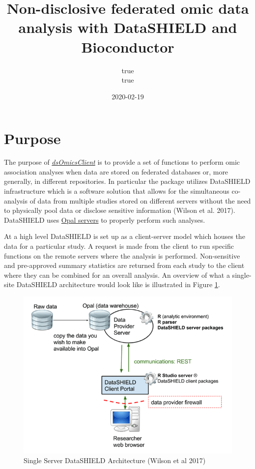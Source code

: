 \documentclass[]{article}
\title{Non-disclosive federated omic data analysis with DataSHIELD and
Bioconductor}
\author{true \\ true}
\date{2020-02-19}
\begin{document}
\maketitle

\hypertarget{purpose}{%
\section{Purpose}\label{purpose}}

The purpose of
\emph{\href{https://github.com/isgloba-brge}{dsOmicsClient}} is to
provide a set of functions to perform omic association analyses when
data are stored on federated databases or, more generally, in different
repositories. In particular the package utilizes DataSHIELD
infrastructure which is a software solution that allows for the
simultaneous co-analysis of data from multiple studies stored on
different servers without the need to physically pool data or disclose
sensitive information (Wilson et al. 2017). DataSHIELD uses
\href{http://opaldoc.obiba.org/en/latest/}{Opal servers} to properly
perform such analyses.

At a high level DataSHIELD is set up as a client-server model which
houses the data for a particular study. A request is made from the
client to run specific functions on the remote servers where the
analysis is performed. Non-sensitive and pre-approved summary statistics
are returned from each study to the client where they can be combined
for an overall analysis. An overview of what a single-site DataSHIELD
architecture would look like is illustrated in Figure
\ref{fig:dsArchitec}.

\begin{figure}

{\centering \includegraphics[width=0.9\linewidth]{fig/singleSiteDSInfrastructure} 

}

\caption{Single Server DataSHIELD Architecture (Wilson et al 2017)}\label{fig:dsArchitec}
\end{figure}
\end{document}
